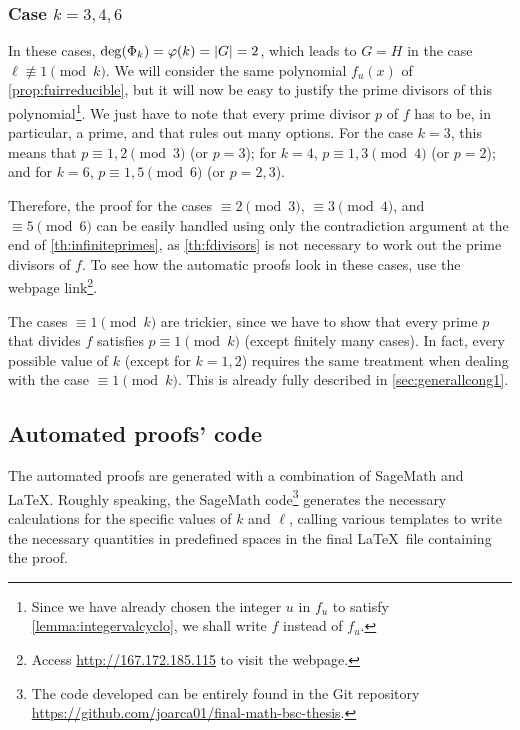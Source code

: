 \documentclass[../main.tex]{subfiles}
\begin{document}
\subsubsection{Case \texorpdfstring{$k=3, 4, 6$}{k=3,4,6}}
In these cases, $\operatorname{deg}(\Phi_k)=\varphi(k)=\abs{G}=2$, which leads to $G=H$ in the case $\ell\not\equiv 1 \pmod{k}$. We will consider the same polynomial $f_u(x)$ of \cref{prop:fuirreducible}, but it will now be easy to justify the prime divisors of this polynomial\footnote{Since we have already chosen the integer $u$ in $f_u$ to satisfy \cref{lemma:integervalcyclo}, we shall write $f$ instead of $f_u$.}. We just have to note that every prime divisor $p$ of $f$ has to be, in particular, a prime, and that rules out many options. For the case $k=3$, this means that $p\equiv 1,2 \pmod{3}$ (or $p=3$); for $k=4$, $p\equiv 1,3 \pmod{4}$ (or $p=2$); and for $k=6$, $p\equiv 1,5 \pmod{6}$ (or $p=2,3$).

Therefore, the proof for the cases $\equiv 2 \pmod{3}$, $\equiv 3 \pmod{4}$, and $\equiv 5 \pmod{6}$ can be easily handled using only the contradiction argument at the end of \cref{th:infiniteprimes}, as \cref{th:fdivisors} is not necessary to work out the prime divisors of $f$. To see how the automatic proofs look in these cases, use the webpage link\footnote{Access \url{http://167.172.185.115} to visit the webpage.}.

The cases $\equiv 1\pmod{k}$ are trickier, since we have to show that every prime $p$ that divides $f$ satisfies $p\equiv 1 \pmod{k}$ (except finitely many cases). In fact, every possible value of $k$ (except for $k=1,2$) requires the same treatment when dealing with the case $\equiv 1\pmod{k}$. This is already fully described in \cref{sec:generallcong1}.

\subsection{Automated proofs' code}\label{sec:code1}
The automated proofs are generated with a combination of SageMath and \LaTeX. Roughly speaking, the SageMath code\footnote{The code developed can be entirely found in the Git repository \url{https://github.com/joarca01/final-math-bsc-thesis}.} generates the necessary calculations for the specific values of $k$ and $\ell$, calling various templates to write the necessary quantities in predefined spaces in the final \LaTeX \ file containing the proof. 
\end{document}
